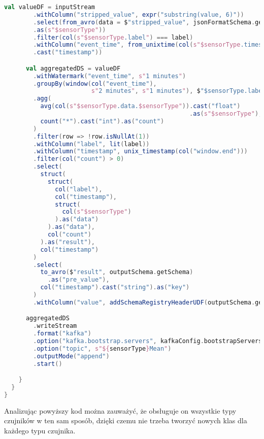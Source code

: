 \begin{lstlisting}[caption=Nowa implementacja przetwarzająca strumienie danych, label={lst:mean_processor_spark},language=Scala]
      val valueDF = inputStream
        .withColumn("stripped_value", expr("substring(value, 6)"))
        .select(from_avro(data = $"stripped_value", jsonFormatSchema.getSchema)
        .as(s"$sensorType"))
        .filter(col(s"$sensorType.label") === label)
        .withColumn("event_time", from_unixtime(col(s"$sensorType.timestamp"))
        .cast("timestamp"))

      val aggregatedDS = valueDF
        .withWatermark("event_time", s"1 minutes")
        .groupBy(window(col("event_time"), 
                        s"2 minutes", s"1 minutes"), $"$sensorType.label")
        .agg(
          avg(col(s"$sensorType.data.$sensorType")).cast("float")
                                                   .as(s"$sensorType"),
          count("*").cast("int").as("count")
        )
        .filter(row => !row.isNullAt(1))
        .withColumn("label", lit(label))
        .withColumn("timestamp", unix_timestamp(col("window.end")))
        .filter(col("count") > 0)
        .select(
          struct(
            struct(
              col("label"),
              col("timestamp"),
              struct(
                col(s"$sensorType")
              ).as("data")
            ).as("data"),
            col("count")
          ).as("result"),
          col("timestamp")
        )
        .select(
          to_avro($"result", outputSchema.getSchema)
            .as("pre_value"),
          col("timestamp").cast("string").as("key")
        )
        .withColumn("value", addSchemaRegistryHeaderUDF(outputSchema.getId)(col("pre_value")))

      aggregatedDS
        .writeStream
        .format("kafka")
        .option("kafka.bootstrap.servers", kafkaConfig.bootstrapServers)
        .option("topic", s"${sensorType}Mean")
        .outputMode("append")
        .start()

    }
  }
} 

\end{lstlisting}

Analizując powyższy kod można zauważyć, że obsługuje on wszystkie typy czujników w ten sam sposób, dzięki czemu nie trzeba tworzyć nowych klas dla każdego typu czujnika.

